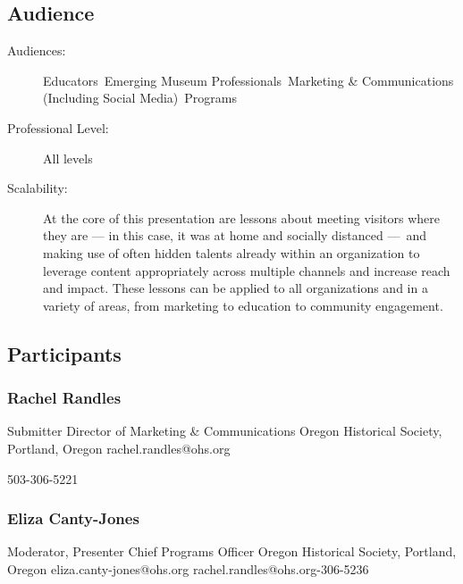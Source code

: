 \documentclass{report}
\begin{document}
              \subsection*{Audience}
                \begin{description}
                  \item [Audiences:]Educators~Emerging Museum Professionals~Marketing \& Communications (Including Social Media)~Programs~
                  \item[Professional Level:]All levels~
                \item[Scalability:] At the core of this presentation are lessons about meeting visitors where they are — in this case, it was at home and socially distanced — and making use of often hidden talents already within an organization to leverage content appropriately across multiple channels and increase reach and impact. These lessons can be applied to all organizations and in a variety of areas, from marketing to education to community engagement.

							
              \end{description}
            \subsection*{Participants}
              \subsubsection*{ Rachel Randles }
              Submitter\newline
              Director of Marketing \& Communications\newline
              Oregon Historical Society, Portland, Oregon
              \newline
              rachel.randles@ohs.org\newline
              
              503-306-5221\newline

              


              
                \subsubsection*{ Eliza Canty-Jones }
                Moderator, Presenter\newline
                Chief Programs Officer\newline
                Oregon Historical Society, Portland, Oregon
                \newline
                eliza.canty-jones@ohs.org\newline
                rachel.randles@ohs.org-306-5236\newline
\end{document}
